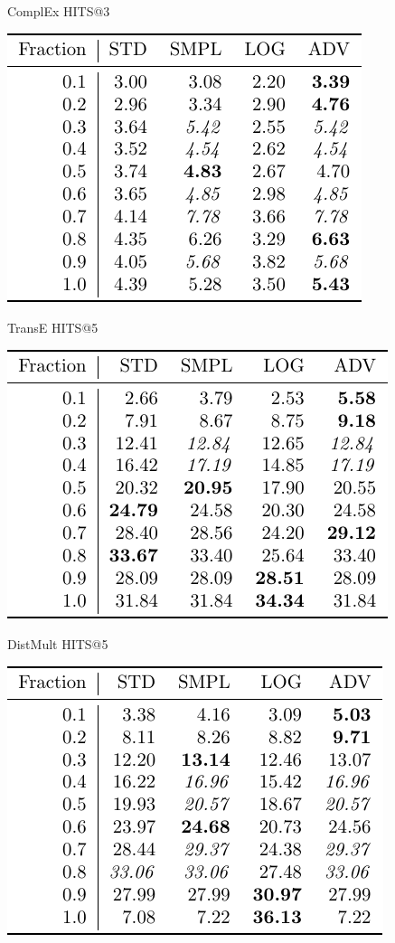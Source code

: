\documentclass{article}
\begin{document}
\begin{figure}
\caption{ComplEx HITS@3}
\end{figure}\begin{figure}
\includegraphics[]{results_TransE_HITS@5}\\
\caption{TransE HITS@5}
\end{figure}\begin{figure}
\includegraphics[]{results_DistMult_HITS@5}\\
\caption{DistMult HITS@5}
\end{figure}\begin{figure}
\includegraphics[]{results_ComplEx_HITS@5}\\

\end{figure}
\end{document}

